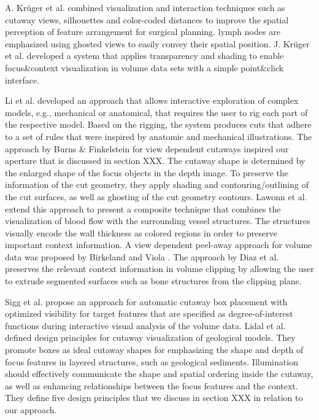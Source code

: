 A. Kr{\"u}ger et al. \cite{Kruger05} combined visualization and interaction techniques such as cutaway views, silhouettes and color-coded distances  to improve the spatial perception of feature arrangement for surgical planning.  lymph nodes are emphasized using ghosted views to easily convey their spatial position.
J. Kr{\"u}ger et al. \cite{kruger06} developed a system that applies transparency and shading to enable focus\&context visualization in volume data sets with a simple point\&click interface.

Li et al. \cite{Li07} developed an approach that allows interactive exploration of complex models, e.g., mechanical or anatomical, that requires the user to rig each part of the respective model. Based on the rigging, the system produces cuts that adhere to a set of rules that were inspired by anatomic and mechanical illustrations. 
The approach by Burns \& Finkelstein \cite{Burns08} for view dependent cutaways inspired our aperture that is discussed in section XXX. The cutaway shape is determined by the enlarged shape of the focus objects in the depth image. To preserve the information of the cut geometry, they apply shading and contouring/outlining of the cut surfaces, as well as ghosting of the cut geometry contours. Lawonn et al. \cite{lawonn16} extend this approach to present a composite technique that combines the visualization of blood flow with the surrounding vessel structures. The structures visually encode the wall thickness as colored regions in order to preserve important context information. A view dependent peel-away approach for volume data was proposed by Birkeland and Viola \cite{birkeland09}. The approach by Diaz et al. \cite{diaz12} preserves the relevant context information in volume clipping by allowing the user to extrude segmented surfaces such as bone structures from the clipping plane.

Sigg et al. \cite{sigg12} propose an approach for automatic cutaway box placement with optimized visibility for target features that are specified as degree-of-interest functions during interactive visual analysis of the volume data. Lidal et al. \cite{Lidal12} defined design principles for cutaway visualization of geological models. They promote boxes as ideal cutaway shapes for emphasizing the shape and depth of focus features in layered structures, such as geological sediments. Illumination should effectively communicate the shape and spatial ordering inside the cutaway, as well as enhancing relationships between the focus features and the context. They define five design principles that we discuss in section XXX in relation to our approach. 

